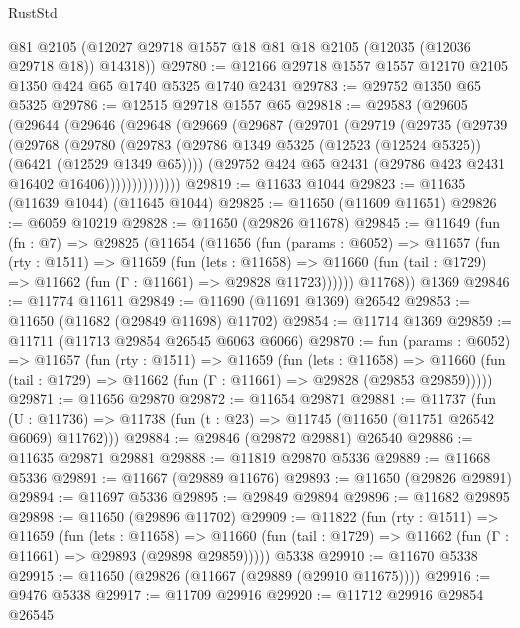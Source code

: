 \begin{lexlean}{RustStd}
\begin{coremodule}
      @81
      @2105
      (@12027 @29718 @1557 @18 @81 @18 @2105 (@12035 (@12036 @29718 @18)) @14318))
@29780 := @12166 @29718 @1557 @1557 @12170 @2105 @1350 @424 @65 @1740 @5325 @1740 @2431
@29783 := @29752 @1350 @65 @5325
@29786 := @12515 @29718 @1557 @65
@29818 := @29583
    (@29605
      (@29644
        (@29646
          (@29648
            (@29669
              (@29687
                (@29701
                  (@29719
                    (@29735
                      (@29739
                        (@29768
                          (@29780
                            (@29783
                              (@29786
                                @1349
                                @5325
                                (@12523 (@12524 @5325))
                                (@6421 (@12529 @1349 @65))))
                            (@29752 @424 @65 @2431 (@29786 @423 @2431 @16402 @16406))))))))))))))
@29819 := @11633 @1044
@29823 := @11635 (@11639 @1044) (@11645 @1044)
@29825 := @11650 (@11609 @11651)
@29826 := @6059 @10219
@29828 := @11650 (@29826 @11678)
@29845 := @11649
    (fun (fn : @7) =>
    @29825
      (@11654
        (@11656
          (fun (params : @6052) =>
          @11657
            (fun (rty : @1511) =>
            @11659
              (fun (lets : @11658) =>
              @11660 (fun (tail : @1729) => @11662 (fun (Γ : @11661) => @29828 @11723))))))
        @11768))
    @1369
@29846 := @11774 @11611
@29849 := @11690 (@11691 @1369) @26542
@29853 := @11650 (@11682 (@29849 @11698) @11702)
@29854 := @11714 @1369
@29859 := @11711 (@11713 @29854 @26545 @6063 @6066)
@29870 := fun (params : @6052) =>
  @11657
    (fun (rty : @1511) =>
    @11659
      (fun (lets : @11658) =>
      @11660 (fun (tail : @1729) => @11662 (fun (Γ : @11661) => @29828 (@29853 @29859)))))
@29871 := @11656 @29870
@29872 := @11654 @29871
@29881 := @11737
    (fun (U : @11736) => @11738 (fun (t : @23) => @11745 (@11650 (@11751 @26542 @6069) @11762)))
@29884 := @29846 (@29872 @29881) @26540
@29886 := @11635 @29871 @29881
@29888 := @11819 @29870 @5336
@29889 := @11668 @5336
@29891 := @11667 (@29889 @11676)
@29893 := @11650 (@29826 @29891)
@29894 := @11697 @5336
@29895 := @29849 @29894
@29896 := @11682 @29895
@29898 := @11650 (@29896 @11702)
@29909 := @11822
    (fun (rty : @1511) =>
    @11659
      (fun (lets : @11658) =>
      @11660 (fun (tail : @1729) => @11662 (fun (Γ : @11661) => @29893 (@29898 @29859)))))
    @5338
@29910 := @11670 @5338
@29915 := @11650 (@29826 (@11667 (@29889 (@29910 @11675))))
@29916 := @9476 @5338
@29917 := @11709 @29916
@29920 := @11712 @29916 @29854 @26545

\end{coremodule}
\end{lexlean}
